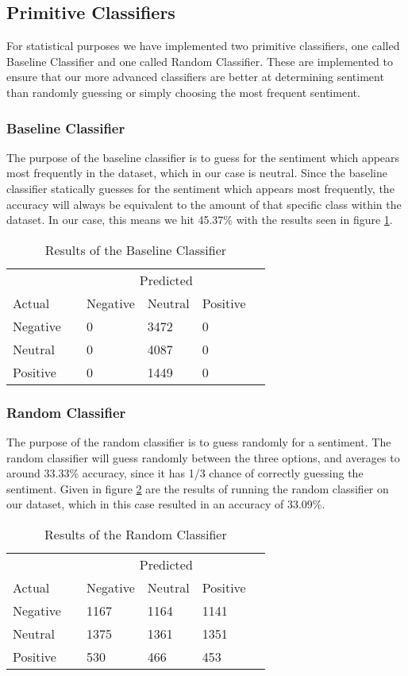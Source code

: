 \subsection{Primitive Classifiers}
For statistical purposes we have implemented two primitive classifiers, one called Baseline Classifier and one called Random Classifier. These are implemented to ensure that our more advanced classifiers are better at determining sentiment than randomly guessing or simply choosing the most frequent sentiment.

\subsubsection{Baseline Classifier}
The purpose of the baseline classifier is to guess for the sentiment which appears most frequently in the dataset, which in our case is neutral. Since the baseline classifier statically guesses for the sentiment which appears most frequently, the accuracy will always be equivalent to the amount of that specific class within the dataset. In our case, this means we hit 45.37\% with the results seen in figure \ref{blresult}. 
\begin{table}[H]
	\begin{tabular}{@{}llllll@{}}
		\toprule
		& & \multicolumn{3}{c}{Predicted} \\\cmidrule{3-5}
		Actual & & Negative & Neutral & Positive &  \\ \midrule
		Negative & & 0 & 3472 & 0 & \\
		Neutral  & & 0 & 4087 & 0 & \\
		Positive & & 0 & 1449 & 0 & \\ \bottomrule
	\end{tabular}
	\centering
	\caption{Results of the Baseline Classifier}
	\label{blresult}
\end{table}
\subsubsection{Random Classifier}
The purpose of the random classifier is to guess randomly for a sentiment. The random classifier will guess randomly between the three options, and averages to around 33.33\% accuracy, since it has 1/3 chance of correctly guessing the sentiment. Given in figure \ref{randresult} are the results of running the random classifier on our dataset, which in this case resulted in an accuracy of 33.09\%.
\begin{table}[H]
	\begin{tabular}{@{}llllll@{}}
		\toprule
		& & \multicolumn{3}{c}{Predicted} \\\cmidrule{3-5}
		Actual & & Negative & Neutral & Positive &  \\ \midrule
		Negative & & 1167 & 1164 & 1141 & \\
		Neutral  & & 1375 & 1361 & 1351 & \\
		Positive & & 530 & 466 & 453 & \\ \bottomrule
	\end{tabular}
	\centering
	\caption{Results of the Random Classifier}
	\label{randresult}
\end{table}
